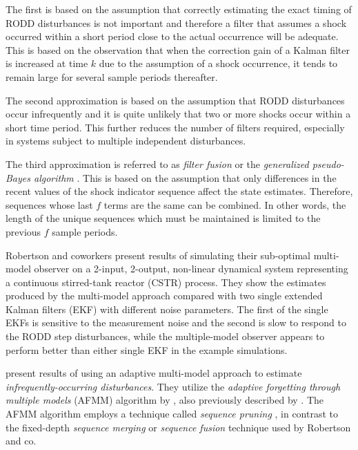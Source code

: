 The first is based on the assumption that correctly estimating the exact timing of RODD disturbances is not important and therefore a filter that assumes a shock occurred within a short period close to the actual occurrence will be adequate. This is based on the observation that when the correction gain of a Kalman filter is increased at time $k$ due to the assumption of a shock occurrence, it tends to remain large for several sample periods thereafter.

The second approximation is based on the assumption that RODD disturbances occur infrequently and it is quite unlikely that two or more shocks occur within a short time period. This further reduces the number of filters required, especially in systems subject to multiple independent disturbances.

The third approximation is referred to as \textit{filter fusion} or the \textit{generalized pseudo-Bayes algorithm} \cite{jaffer_estimation_1971, buxbaum_recursive_1970, tugnait_detection_1982}. This is based on the assumption that only differences in the recent values of the shock indicator sequence affect the state estimates. Therefore, sequences whose last $f$ terms are the same can be combined. In other words, the length of the unique sequences which must be maintained is limited to the previous $f$ sample periods.

Robertson and coworkers present results of simulating their sub-optimal multi-model observer on a 2-input, 2-output, non-linear dynamical system representing a continuous stirred-tank reactor (CSTR) process. They show the estimates produced by the multi-model approach compared with two single extended Kalman filters (EKF) with different noise parameters. The first of the single EKFs is sensitive to the measurement noise and the second is slow to respond to the RODD step disturbances, while the multiple-model observer appears to perform better than either single EKF in the example simulations.

\cite{eriksson_classification_1996} present results of using an adaptive multi-model approach to estimate \textit{infrequently-occurring disturbances}. They utilize the \textit{adaptive forgetting through multiple models} (AFMM) algorithm by \cite{andersson_adaptive_1985}, also previously described by \cite{gustafsson_estimation_1993}. The AFMM algorithm employs a technique called \textit{sequence pruning} \cite{tugnait_detection_1982}, in contrast to the fixed-depth \textit{sequence merging} or \textit{sequence fusion} technique \citep{blom_interacting_1988} used by Robertson and co.


